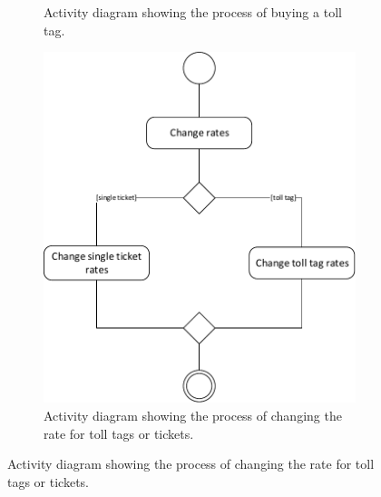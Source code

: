 \begin{figure}[H]
\begin{subfigure}[b]{0.3\textwidth}
	\caption{Activity diagram showing the process of buying a toll tag.}
	\end{subfigure}
	\hfill
	\begin{subfigure}[b]{0.5\textwidth}
	\includegraphics[width=\textwidth]{img/activity_diagram/change_rates}
	\caption{Activity diagram showing the process of changing the rate for toll tags or tickets.}
	\end{subfigure}
\end{figure}


